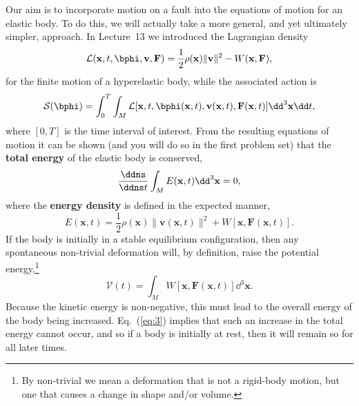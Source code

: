 Our aim is to incorporate motion on a fault into the equations of motion for an elastic body. To do this, we will 
actually take a more general, and yet ultimately simpler, approach. In Lecture~13 we introduced the Lagrangian density
\begin{equation}\label{eq:1}
\mathcal{L}(\mathbf{x}, t, \bphi, \mathbf{v}, \mathbf{F}) = \frac{1}{2}\rho(\mathbf{x})\|\mathbf{v}\|^2 - W(\mathbf{x}, \mathbf{F}),
\end{equation}
for the finite motion of a hyperelastic body, while the associated action is
\begin{equation}\label{eq:2}
\mathcal{S}(\bphi) = \int_{0}^{T}\int_{M}\mathcal{L}[\mathbf{x}, t, \bphi(\mathbf{x}, t), \mathbf{v}(\mathbf{x}, t), \mathbf{F}(\mathbf{x}, t)]\dd^{3}\mathbf{x}\dd t,
\end{equation}
where $[0, T]$ is the time interval of interest. From the resulting equations of motion it can be shown (and you will do so in the first problem set) that the 
\textbf{total energy} of the elastic body is conserved,
\begin{equation}\label{eq:3}
\frac{\ddns}{\ddns t}\int_{M}E(\mathbf{x}, t)\dd^{3}\mathbf{x} = 0,
\end{equation}
where the \textbf{energy density} is defined in the expected manner,
\begin{equation}\label{eq:4}
E(\mathbf{x}, t) = \frac{1}{2}\rho(\mathbf{x})\|\mathbf{v}(\mathbf{x}, t)\|^2 + W[\mathbf{x}, \mathbf{F}(\mathbf{x}, t)].
\end{equation}
If the body is initially in a stable equilibrium configuration, then any spontaneous non-trivial deformation will, by definition, raise the potential energy,\footnote{By non-trivial we mean a deformation that is not a rigid-body motion, 
but one that causes a change in shape and/or volume.}
\begin{equation}\label{eq:5}
\mathcal{V}(t) = \int_{M}W[\mathbf{x}, \mathbf{F}(\mathbf{x}, t)]\dd^{3}\mathbf{x}.
\end{equation}
Because the kinetic energy is non-negative, this must lead to the overall energy of the body being increased. Eq.~(\ref{eq:3}) implies that such an 
increase in the total energy cannot occur, and so if a body is initially at rest, then it will remain so for all
later times. 

